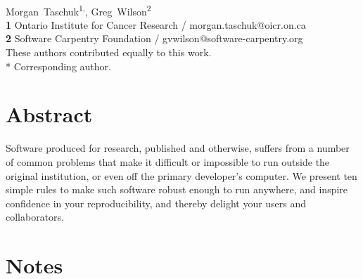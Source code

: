 \documentclass[10pt,letterpaper]{article}
\date{}
\begin{document}
\vspace*{0.2in}


\begin{flushleft}
{\Large
\textbf{}
}
\newline
\\
{Morgan~Taschuk}\textsuperscript{1,\ddag *},
{Greg~Wilson}\textsuperscript{2}
\\
\textbf{1} Ontario Institute for Cancer Research / morgan.taschuk@oicr.on.ca
\\
\textbf{2} Software Carpentry Foundation / gvwilson@software-carpentry.org
\\
\bigskip
{\ddag} These authors contributed equally to this work.
\\
* Corresponding author.
\end{flushleft}

\section*{Abstract}

Software produced for research,
published and otherwise,
suffers from a number of common problems
that make it difficult or impossible to run outside the original institution,
or even off the primary developer's computer.
We present ten simple rules to make such software robust enough to run anywhere,
and inspire confidence in your reproducibility,
and thereby delight your users and collaborators.

\section*{Notes}
\end{document}
